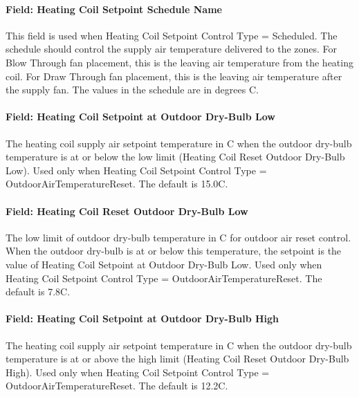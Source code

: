 \paragraph{Field: Heating Coil Setpoint Schedule Name}\label{field-heating-coil-setpoint-schedule-name-4}

This field is used when Heating Coil Setpoint Control Type = Scheduled. The schedule should control the supply air temperature delivered to the zones. For Blow Through fan placement, this is the leaving air temperature from the heating coil. For Draw Through fan placement, this is the leaving air temperature after the supply fan. The values in the schedule are in degrees C.

\paragraph{Field: Heating Coil Setpoint at Outdoor Dry-Bulb Low}\label{field-heating-coil-setpoint-at-outdoor-dry-bulb-low-2}

The heating coil supply air setpoint temperature in C when the outdoor dry-bulb temperature is at or below the low limit (Heating Coil Reset Outdoor Dry-Bulb Low). Used only when Heating Coil Setpoint Control Type = OutdoorAirTemperatureReset. The default is 15.0C.

\paragraph{Field: Heating Coil Reset Outdoor Dry-Bulb Low}\label{field-heating-coil-reset-outdoor-dry-bulb-low-2}

The low limit of outdoor dry-bulb temperature in C for outdoor air reset control. When the outdoor dry-bulb is at or below this temperature, the setpoint is the value of Heating Coil Setpoint at Outdoor Dry-Bulb Low. Used only when Heating Coil Setpoint Control Type = OutdoorAirTemperatureReset. The default is 7.8C.

\paragraph{Field: Heating Coil Setpoint at Outdoor Dry-Bulb High}\label{field-heating-coil-setpoint-at-outdoor-dry-bulb-high-2}

The heating coil supply air setpoint temperature in C when the outdoor dry-bulb temperature is at or above the high limit (Heating Coil Reset Outdoor Dry-Bulb High). Used only when Heating Coil Setpoint Control Type = OutdoorAirTemperatureReset. The default is 12.2C.

